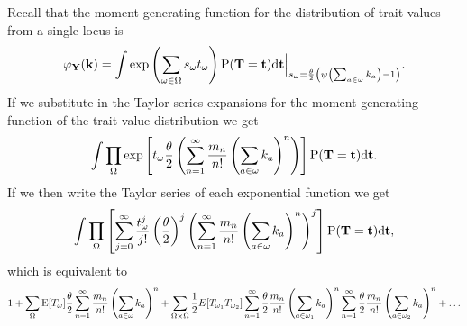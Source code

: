 Recall that the moment generating function for the distribution of trait values
from a single locus is
\begin{equation*}
  \varphi_{\mathbf{Y}}(\mathbf{k}) = \int \exp \left( \sum_{\omega \in \Omega} s_{\omega}t_{\omega} \right)
  \mathrm{P}(\mathbf{T}=\mathbf{t})\mathrm{d}\mathbf{t}
  \Bigr|_{s_{\omega}=\frac{\theta}{2} \left( \psi\left(\sum_{a \in \omega}k_{a}\right) -1 \right)}.
\end{equation*}
If we substitute in the Taylor series expansions for the moment generating
function of the trait value distribution we get
\begin{equation*}
  \int \prod_{\Omega} \exp\left[ t_{\omega} \frac{\theta}{2} \left( \sum_{n=1}^{\infty} \frac{m_n}{n!}
    \left( \sum_{a \in \omega} k_a \right)^n \right) \right]
  \mathrm{P}(\mathbf{T} = \mathbf{t}) \mathrm{d}\mathbf{t}.
\end{equation*}
If we then write the Taylor series of each exponential function we get
\begin{equation*}
  \int \prod_{\Omega} \left[ \sum_{j=0}^\infty \frac{t_{\omega}^j}{j!}
  \left( \frac{\theta}{2} \right)^j \left( \sum_{n=1}^{\infty} \frac{m_n}{n!}
  \left( \sum_{a \in \omega} k_a \right)^n \right)^j \right]
  \mathrm{P}(\mathbf{T} = \mathbf{t}) \mathrm{d}\mathbf{t},
\end{equation*}
which is equivalent to
\begin{equation*}
  1 + \sum_{\Omega} \mathrm{E}[T_\omega] \frac{\theta}{2} \sum_{n=1}^{\infty} \frac{m_n}{n!} \left(
  \sum_{a \in \omega} k_a \right)^n +
  \sum_{\Omega \times \Omega} \frac{1}{2} E[T_{\omega_1}T_{\omega_2}]
  \sum_{n=1}^{\infty} \frac{\theta}{2} \frac{m_n}{n!} \left(\sum_{a \in \omega_1} k_a \right)^n
  \sum_{n=1}^{\infty} \frac{\theta}{2} \frac{m_n}{n!} \left(\sum_{a \in \omega_2} k_a \right)^n + \ldots
\end{equation*}

